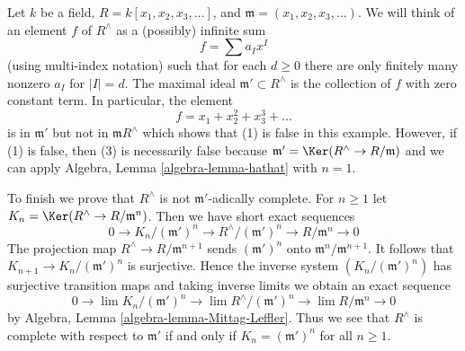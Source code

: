 \medskip\noindent
Let $k$ be a field, $R = k[x_1, x_2, x_3, \ldots]$, and
$\mathfrak m = (x_1, x_2, x_3, \ldots)$.
We will think of an element $f$ of $R^\wedge$ as a (possibly) infinite sum
$$
f = \sum a_I x^I
$$
(using multi-index notation) such that for each $d \geq 0$ there
are only finitely many nonzero $a_I$ for $|I| = d$. The maximal
ideal $\mathfrak m' \subset R^\wedge$ is the collection of $f$ with
zero constant term. In particular, the element
$$
f = x_1 + x_2^2 + x_3^3 + \ldots
$$
is in $\mathfrak m'$ but not in $\mathfrak m R^\wedge$ which
shows that (1) is false in this example. However, if (1) is
false, then (3) is necessarily false because
$\mathfrak m' = \Ker(R^\wedge \to R/\mathfrak m)$
and we can apply
Algebra, Lemma \ref{algebra-lemma-hathat} with $n = 1$.

\medskip\noindent
To finish we prove that $R^\wedge$ is not $\mathfrak m'$-adically complete.
For $n \geq 1$ let $K_n = \Ker(R^\wedge \to R/\mathfrak m^n)$. Then
we have short exact sequences
$$
0 \to K_n/(\mathfrak m')^n \to R^\wedge/(\mathfrak m')^n \to
R/\mathfrak m^n \to 0
$$
The projection map $R^\wedge \to R/\mathfrak m^{n + 1}$ sends
$(\mathfrak m')^n$ onto $\mathfrak m^n/\mathfrak m^{n + 1}$.
It follows that $K_{n + 1} \to K_n/(\mathfrak m')^n$ is surjective.
Hence the inverse system $\left(K_n/(\mathfrak m')^n\right)$
has surjective transition maps and
taking inverse limits we obtain an exact sequence
$$
0 \to \lim K_n/(\mathfrak m')^n \to
\lim R^\wedge/(\mathfrak m')^n \to
\lim R/\mathfrak m^n \to 0
$$
by Algebra, Lemma \ref{algebra-lemma-Mittag-Leffler}.
Thus we see that $R^\wedge$ is complete with respect to $\mathfrak m'$
if and only if $K_n = (\mathfrak m')^n$ for all $n \geq 1$.

